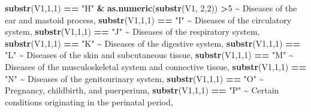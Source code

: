 \documentclass[preprint, 3p,
authoryear]{elsarticle} %
\newenvironment{Shaded}{\begin{snugshade}}{\end{snugshade}}
\newcommand{\DecValTok}[1]{\textcolor[rgb]{0.00,0.00,0.81}{#1}}
\newcommand{\KeywordTok}[1]{\textcolor[rgb]{0.13,0.29,0.53}{\textbf{#1}}}
\newcommand{\NormalTok}[1]{#1}
\newcommand{\OperatorTok}[1]{\textcolor[rgb]{0.81,0.36,0.00}{\textbf{#1}}}
\newcommand{\StringTok}[1]{\textcolor[rgb]{0.31,0.60,0.02}{#1}}
\begin{document}
\begin{Shaded}
\begin{Highlighting}[]
                              \KeywordTok{substr}\NormalTok{(V1,}\DecValTok{1}\NormalTok{,}\DecValTok{1}\NormalTok{) }\OperatorTok{==}\StringTok{ "H"} \OperatorTok{\&}\StringTok{ }\KeywordTok{as.numeric}\NormalTok{(}\KeywordTok{substr}\NormalTok{(V1, }\DecValTok{2}\NormalTok{,}\DecValTok{2}\NormalTok{)) }\OperatorTok{\textgreater{}}\DecValTok{5} \OperatorTok{\textasciitilde{}}\StringTok{ \textquotesingle{}    Diseases of the ear and mastoid process\textquotesingle{}}\NormalTok{,}
                              \KeywordTok{substr}\NormalTok{(V1,}\DecValTok{1}\NormalTok{,}\DecValTok{1}\NormalTok{) }\OperatorTok{==}\StringTok{ "I"} \OperatorTok{\textasciitilde{}}\StringTok{ \textquotesingle{}Diseases of the circulatory system\textquotesingle{}}\NormalTok{,}
                              \KeywordTok{substr}\NormalTok{(V1,}\DecValTok{1}\NormalTok{,}\DecValTok{1}\NormalTok{) }\OperatorTok{==}\StringTok{ "J"} \OperatorTok{\textasciitilde{}}\StringTok{ \textquotesingle{}Diseases of the respiratory system\textquotesingle{}}\NormalTok{,}
                              \KeywordTok{substr}\NormalTok{(V1,}\DecValTok{1}\NormalTok{,}\DecValTok{1}\NormalTok{) }\OperatorTok{==}\StringTok{ "K"} \OperatorTok{\textasciitilde{}}\StringTok{ \textquotesingle{}Diseases of the digestive system\textquotesingle{}}\NormalTok{,}
                              \KeywordTok{substr}\NormalTok{(V1,}\DecValTok{1}\NormalTok{,}\DecValTok{1}\NormalTok{) }\OperatorTok{==}\StringTok{ "L"} \OperatorTok{\textasciitilde{}}\StringTok{ \textquotesingle{}Diseases of the skin and subcutaneous tissue\textquotesingle{}}\NormalTok{,}
                              \KeywordTok{substr}\NormalTok{(V1,}\DecValTok{1}\NormalTok{,}\DecValTok{1}\NormalTok{) }\OperatorTok{==}\StringTok{ "M"} \OperatorTok{\textasciitilde{}}\StringTok{ \textquotesingle{}Diseases of the musculoskeletal system and connective tissue\textquotesingle{}}\NormalTok{,}
                              \KeywordTok{substr}\NormalTok{(V1,}\DecValTok{1}\NormalTok{,}\DecValTok{1}\NormalTok{) }\OperatorTok{==}\StringTok{ "N"} \OperatorTok{\textasciitilde{}}\StringTok{ \textquotesingle{}Diseases of the genitourinary system\textquotesingle{}}\NormalTok{,}
                              \KeywordTok{substr}\NormalTok{(V1,}\DecValTok{1}\NormalTok{,}\DecValTok{1}\NormalTok{) }\OperatorTok{==}\StringTok{ "O"} \OperatorTok{\textasciitilde{}}\StringTok{ \textquotesingle{}Pregnancy, childbirth, and puerperium\textquotesingle{}}\NormalTok{,}
                              \KeywordTok{substr}\NormalTok{(V1,}\DecValTok{1}\NormalTok{,}\DecValTok{1}\NormalTok{) }\OperatorTok{==}\StringTok{ "P"} \OperatorTok{\textasciitilde{}}\StringTok{ \textquotesingle{}Certain conditions originating in the perinatal period\textquotesingle{}}\NormalTok{,}

\end{Highlighting}
\end{Shaded}
\end{document}
